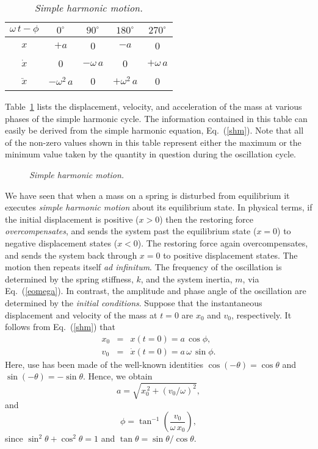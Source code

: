 \begin{table}\centering
\begin{tabular}{c|cccc}\hline
$\omega\,t-\phi$ & $0^\circ$ & $90^\circ$ & $180^\circ$ & $270^\circ$\\[0.5ex]\hline
$x$              & $+a$     & 0         & $-a$       & 0 \\[0.5ex]
$\dot{x}$        & 0        & $-\omega\,a$ & 0 & $+\omega\,a$ \\[0.5ex]
$\ddot{x}$       & $-\omega^2\,a$ &0& $+\omega^2\,a$ & 0
\end{tabular}
\caption{\em Simple harmonic motion.}\label{tshm}
\end{table}

Table~\ref{tshm} lists the displacement, velocity, and acceleration of the mass at various phases of the
simple harmonic cycle. The information contained in this table can easily be derived from the
simple harmonic equation, Eq.~(\ref{shm}). Note that all of the non-zero values
shown in this table represent either the maximum or the minimum value taken by   the quantity in question during the
oscillation  cycle.

\begin{figure}
\epsfysize=3in
\centerline{}
\caption{\em Simple harmonic motion.}\label{f96}  
\end{figure}

We have seen that when a mass on a spring is disturbed from equilibrium it executes {\em simple harmonic
motion} about its equilibrium state. In physical terms, if the initial displacement is positive ($x>0$) then the
restoring force {\em overcompensates}, and sends the system past the equilibrium state ($x=0$) to
negative displacement states ($x<0$). The restoring force again overcompensates, and sends the
system back through $x=0$ to positive displacement states. The motion then repeats itself {\em ad infinitum}. 
The frequency of the oscillation is determined by the spring stiffness, $k$,  and the system
inertia, $m$,  via Eq.~(\ref{eomega}). 
In contrast, the amplitude and phase angle of the oscillation are determined by the {\em initial conditions}. 
Suppose that the instantaneous displacement and velocity of the mass at $t=0$ are $x_0$ and $v_0$,
respectively. It follows from Eq.~(\ref{shm}) that
\begin{eqnarray}
x_0 &=& x(t=0) = a\,\cos\phi,\\[0.5ex]
v_0 &=& \dot{x}(t=0) =a\,\omega\,\sin\phi.
\end{eqnarray}
Here, use has been made of the well-known identities $\cos(-\theta) =\cos\theta$ and $\sin(-\theta)
=-\sin\theta$. Hence, we obtain
\begin{equation}
a = \sqrt{x_0^{\,2} + (v_0/\omega)^2},
\end{equation}
and
\begin{equation}
\phi =\tan^{-1}\!\left(\frac{v_0}{\omega\,x_0}\right),
\end{equation}
since $\sin^2\theta+\cos^2\theta =1$ and $\tan\theta = \sin\theta/\cos\theta$.

